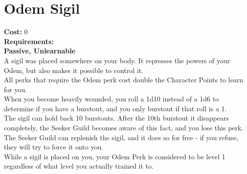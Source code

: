 \section{Odem Sigil}\label{perk:odemSigil}
\textbf{Cost:} 0\\
\textbf{Requirements:}\\
\textbf{Passive, Unlearnable}\\
A sigil was placed somewhere on your body.
It represses the powers of your Odem, but also makes it possible to control it.\\
All perks that require the Odem perk cost double the Character Points to learn for you.\\
When you become heavily wounded, you roll a 1d10 instead of a 1d6 to determine if you have a burstout, and you only burstout if that roll is a 1.\\
The sigil can hold back 10 burstouts.
After the 10th burstout it disappears completely, the Seeker Guild becomes aware of this fact, and you lose this perk.
The Seeker Guild can replenish the sigil, and it does so for free - if you refuse, they will try to force it onto you.\\
While a sigil is placed on you, your Odem Perk is considered to be level 1 regardless of what level you actually trained it to.\\